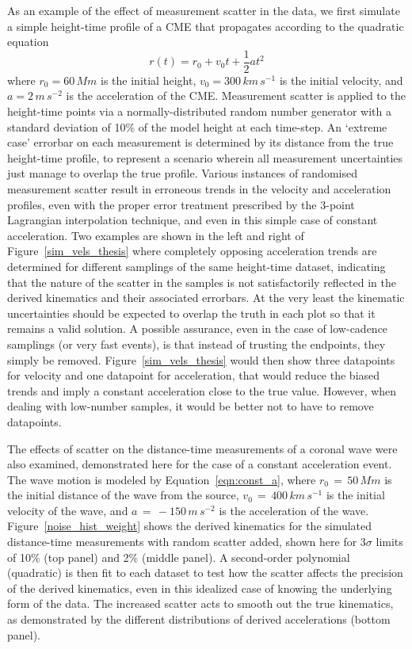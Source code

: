 \documentclass[structabstract]{aa}
\begin{document}
As an example of the effect of measurement scatter in the data, we first simulate a simple height-time profile of a CME that propagates according to the quadratic equation
\begin{equation}
\label{eqn:const_a}
r(t) = r_0 + v_0 t + \frac{1}{2}a t^2
\end{equation}
where $r_0=60\,Mm$ is the initial height, $v_0=300\,km\,s^{-1}$ is the initial velocity, and $a=2\,m\,s^{-2}$ is the acceleration of the CME. Measurement scatter is applied to the height-time points via a normally-distributed random number generator with a standard deviation of 10\% of the model height at each time-step. An `extreme case' errorbar on each measurement is determined by its distance from the true height-time profile, to represent a scenario wherein all measurement uncertainties just manage to overlap the true profile. Various instances of randomised measurement scatter result in erroneous trends in the velocity and acceleration profiles, even with the proper error treatment prescribed by the 3-point Lagrangian interpolation technique, and even in this simple case of constant acceleration. Two examples are shown in the left and right of Figure~\ref{sim_vels_thesis} where completely opposing acceleration trends are determined for different samplings of the same height-time dataset, indicating that the nature of the scatter in the samples is not satisfactorily reflected in the derived kinematics and their associated errorbars. At the very least the kinematic uncertainties should be expected to overlap the truth in each plot so that it remains a valid solution. A possible assurance, even in the case of low-cadence samplings (or very fast events), is that instead of trusting the endpoints, they simply be removed. Figure~\ref{sim_vels_thesis} would then show three datapoints for velocity and one datapoint for acceleration, that would reduce the biased trends and imply a constant acceleration close to the true value. However, when dealing with low-number samples, it would be better not to have to remove datapoints.


The effects of scatter on the distance-time measurements of a coronal wave were also examined, demonstrated here for the case of a constant acceleration event. The wave motion is modeled by Equation~\ref{eqn:const_a}, where $r_0\,=\,50\,Mm$ is the initial distance of the wave from the source, $v_0\,=\,400\,km\,s^{-1}$ is the initial velocity of the wave, and $a\,=\,-150\,m\,s^{-2}$ is the acceleration of the wave. Figure~\ref{noise_hist_weight} shows the derived kinematics for the simulated distance-time measurements with random scatter added, shown here for 3$\sigma$ limits of 10\% (top panel) and 2\% (middle panel). A second-order polynomial (quadratic) is then fit to each dataset to test how the scatter affects the precision of the derived kinematics, even in this idealized case of knowing the underlying form of the data. The increased scatter acts to smooth out the true kinematics, as demonstrated by the different distributions of derived accelerations (bottom panel).
\end{document}
